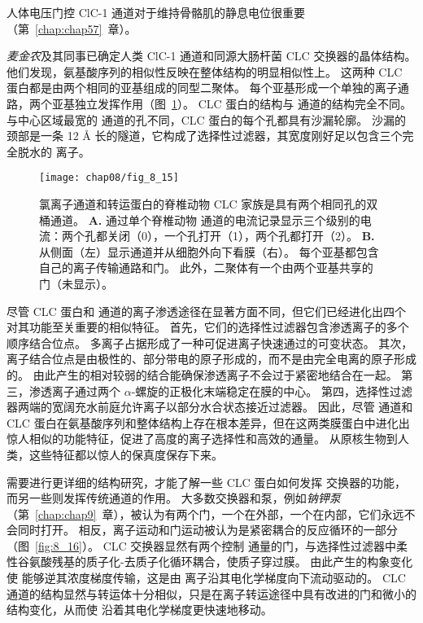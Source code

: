 人体电压门控 ClC-1 通道对于维持骨骼肌的静息电位很重要（第~\ref{chap:chap57}~章）。


\textit{麦金农}及其同事已确定人类 ClC-1 通道和同源大肠杆菌 CLC 交换器的晶体结构。
他们发现，氨基酸序列的相似性反映在整体结构的明显相似性上。
这两种 CLC 蛋白都是由两个相同的亚基组成的同型二聚体。
每个亚基形成一个单独的离子通路，两个亚基独立发挥作用（图~\ref{fig:8_15}）。
CLC 蛋白的结构与  通道的结构完全不同。
与中心区域最宽的  通道的孔不同，CLC 蛋白的每个孔都具有沙漏轮廓。
沙漏的颈部是一条 12 Å 长的隧道，它构成了选择性过滤器，其宽度刚好足以包含三个完全脱水的  离子。


\begin{figure}[htbp]
	\centering
	\texttt{[image: chap08/fig\_8\_15]}
	\caption{氯离子通道和转运蛋白的脊椎动物 CLC 家族是具有两个相同孔的双桶通道。
		\textbf{A.} 通过单个脊椎动物  通道的电流记录显示三个级别的电流：两个孔都关闭（0），一个孔打开（1），两个孔都打开（2）。 
		\textbf{B.} 从侧面（左）显示通道并从细胞外向下看膜（右）。
		每个亚基都包含自己的离子传输通路和门。
		此外，二聚体有一个由两个亚基共享的门（未显示）。}
	\label{fig:8_15}
\end{figure}


尽管 CLC 蛋白和  通道的离子渗透途径在显著方面不同，但它们已经进化出四个对其功能至关重要的相似特征。
首先，它们的选择性过滤器包含渗透离子的多个顺序结合位点。
多离子占据形成了一种可促进离子快速通过的可变状态。
其次，离子结合位点是由极性的、部分带电的原子形成的，而不是由完全电离的原子形成的。
由此产生的相对较弱的结合能确保渗透离子不会过于紧密地结合在一起。
第三，渗透离子通过两个 $\alpha$-螺旋的正极化末端稳定在膜的中心。
第四，选择性过滤器两端的宽阔充水前庭允许离子以部分水合状态接近过滤器。
因此，尽管  通道和 CLC 蛋白在氨基酸序列和整体结构上存在根本差异，但在这两类膜蛋白中进化出惊人相似的功能特征，促进了高度的离子选择性和高效的通量。 
从原核生物到人类，这些特征都以惊人的保真度保存下来。


需要进行更详细的结构研究，才能了解一些 CLC 蛋白如何发挥  交换器的功能，而另一些则发挥传统通道的作用。
大多数交换器和泵，例如\textit{钠钾泵}（第~\ref{chap:chap9}~章），被认为有两个门，一个在外部，一个在内部，它们永远不会同时打开。
相反，离子运动和门运动被认为是紧密耦合的反应循环的一部分（图~\ref{fig:8_16}）。
CLC 交换器显然有两个控制  通量的门，与选择性过滤器中柔性谷氨酸残基的质子化-去质子化循环耦合，使质子穿过膜。
由此产生的构象变化使  能够逆其浓度梯度传输，这是由  离子沿其电化学梯度向下流动驱动的。
CLC 通道的结构显然与转运体十分相似，只是在离子转运途径中具有改进的门和微小的结构变化，从而使  沿着其电化学梯度更快速地移动。


